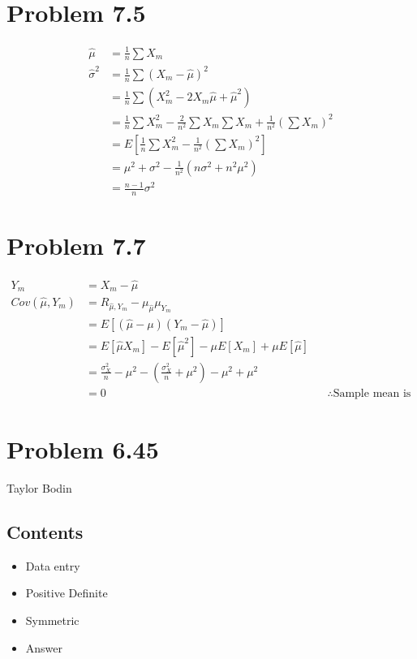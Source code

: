 \documentclass[12pt]{article}
\begin{document}
\section{Problem 7.5}
\begin{align*}
  \hat\mu &= \frac{1}{n}\sum X_m \\
  \hat\sigma^2 &= \frac{1}{n}\sum (X_m-\hat\mu)^2 \\
  &= \frac{1}{n}\sum \left(X_m^2-2X_m\hat\mu + \hat\mu^2\right) \\
  &= \frac{1}{n}\sum X_m^2 -\frac{2}{n^2} \sum X_m \sum X_m + \frac{1}{n^2}\left(\sum X_m\right)^2 \\
  &= E\left[\frac{1}{n}\sum X_m^2 -\frac{1}{n^2} \left(\sum X_m\right)^2\right] \\
  &= \mu^2 + \sigma^2 - \frac{1}{n^2}\left( n\sigma^2 + n^2\mu^2 \right) \\
  &= \frac{n-1}{n}\sigma^2
\end{align*}

\section{Problem 7.7}
\begin{align*}
  Y_m &= X_m - \hat\mu \\
  Cov(\hat\mu,Y_m) &= R_{\hat\mu,Y_m} - \mu_{\hat\mu}\mu_{Y_m} \\
  &= E\left[ (\hat\mu - \mu)(Y_{m} - \hat\mu) \right] \\
  &= E[\hat\mu X_m] - E[\hat\mu^2] - \mu E[X_m] + \mu E[\hat\mu] \\
  &= \frac{\sigma_X^2}{n} - \mu^2 - (\frac{\sigma_X^2}{n} + \mu^2) - \mu^2 + \mu^2 \\
  &= 0 & & \therefore \textrm{Sample mean is independent of sample variance.}
\end{align*}

\section*{Problem 6.45}

\begin{par}
Taylor Bodin
\end{par} \vspace{1em}

\subsection*{Contents}

\begin{itemize}
\setlength{\itemsep}{-1ex}
   \item Data entry
   \item Positive Definite
   \item Symmetric
   \item Answer
\end{itemize}
\end{document}
